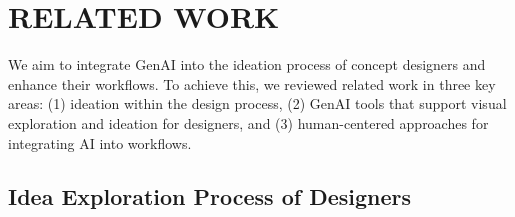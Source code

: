





\section{RELATED WORK}
We aim to integrate GenAI into the ideation process of concept designers and enhance their workflows. To achieve this, we reviewed related work in three key areas: (1) ideation within the design process, (2) GenAI tools that support visual exploration and ideation for designers, and (3) human-centered approaches for integrating AI into workflows.

\subsection{Idea Exploration Process of Designers} %


